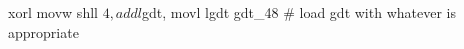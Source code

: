 \documentclass[varwidth=28em,crop]{standalone}
\begin{document}
\begin{gascode}
xorl %
movw %
shll $4,   %
addl $gdt, %
movl %
lgdt gdt_48     # load gdt with whatever is appropriate
\end{gascode}
\end{document}
